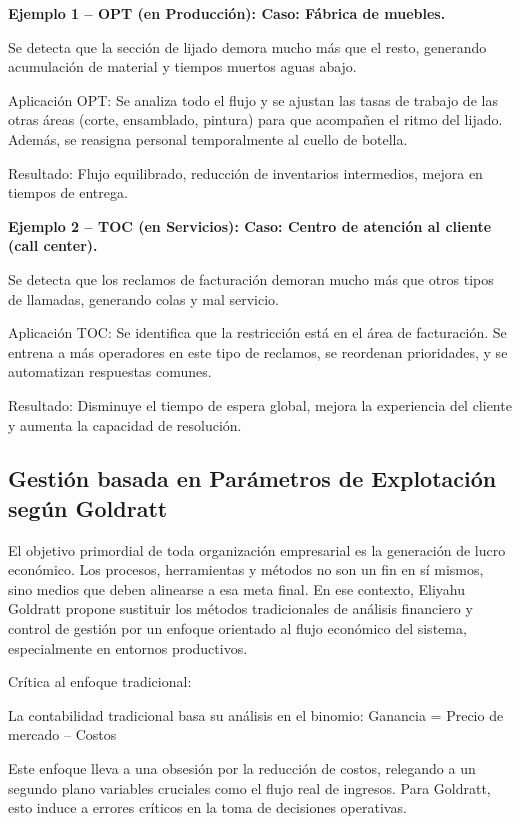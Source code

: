 \documentclass[a4paper,oneside,11pt]{article}
\begin{document}
\textbf{Ejemplo 1 – OPT (en Producción): Caso: Fábrica de muebles.}

Se detecta que la sección de lijado demora mucho más que el resto, generando acumulación de material y tiempos muertos aguas abajo.

Aplicación OPT:
Se analiza todo el flujo y se ajustan las tasas de trabajo de las otras áreas (corte, ensamblado, pintura) para que acompañen el ritmo del lijado. Además, se reasigna personal temporalmente al cuello de botella.

Resultado: Flujo equilibrado, reducción de inventarios intermedios, mejora en tiempos de entrega.

\textbf{Ejemplo 2 – TOC (en Servicios): Caso: Centro de atención al cliente (call center).}

Se detecta que los reclamos de facturación demoran mucho más que otros tipos de llamadas, generando colas y mal servicio.

Aplicación TOC:
Se identifica que la restricción está en el área de facturación. Se entrena a más operadores en este tipo de reclamos, se reordenan prioridades, y se automatizan respuestas comunes.

Resultado: Disminuye el tiempo de espera global, mejora la experiencia del cliente y aumenta la capacidad de resolución.

\subsection{Gestión basada en Parámetros de Explotación según Goldratt}

El objetivo primordial de toda organización empresarial es la generación de lucro económico. Los procesos, herramientas y métodos no son un fin en sí mismos, sino medios que deben alinearse a esa meta final. En ese contexto, Eliyahu Goldratt propone sustituir los métodos tradicionales de análisis financiero y control de gestión por un enfoque orientado al flujo económico del sistema, especialmente en entornos productivos.

Crítica al enfoque tradicional:

La contabilidad tradicional basa su análisis en el binomio: Ganancia = Precio de mercado – Costos

Este enfoque lleva a una obsesión por la reducción de costos, relegando a un segundo plano variables cruciales como el flujo real de ingresos. Para Goldratt, esto induce a errores críticos en la toma de decisiones operativas.
\end{document}
